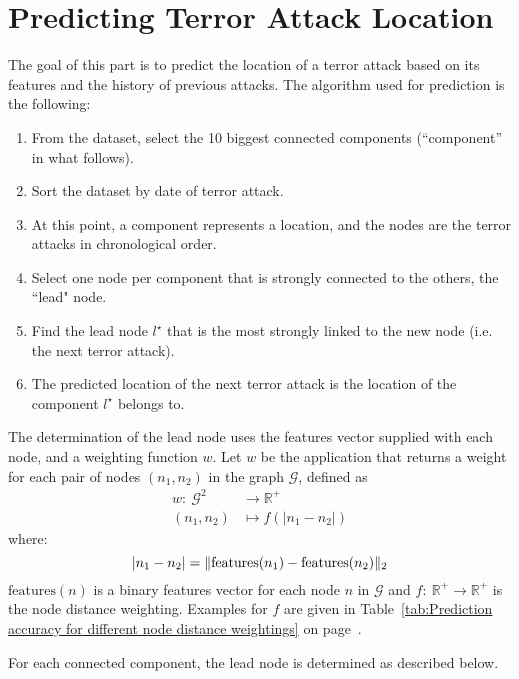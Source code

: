 \section{Predicting Terror Attack Location}
\label{sec:Predictions}
The goal of this part is to predict the location of a terror attack based on its features and the history of previous attacks.
The algorithm used for prediction is the following:
\begin{enumerate}
\item From the dataset, select the 10 biggest connected components (``component'' in what follows).
\item Sort the dataset by date of terror attack.
\item At this point, a component represents a location, and the nodes are the terror attacks in chronological order.
\item Select one node per component that is strongly connected to the others, the ``lead" node.
\item Find the lead node $l^\star$ that is the most strongly linked to the new node (i.e. the next terror attack).
\item The predicted location of the next terror attack is the location of the component $l^\star$ belongs to.
\end{enumerate}

The determination of the lead node uses the features vector supplied with each node, and a weighting function $w$.
Let $w$ be the application that returns a weight for each pair of nodes $(n_1,n_2)$ in the graph $\mathcal{G}$, defined as
\begin{align}
w:~ \mathcal{G}^2	& \to \mathbb{R}^+ \\
(n_1,n_2) 			& \mapsto f(|n_1-n_2|)
\end{align}
where:
\begin{equation}
|n_1-n_2| = \| \text{features}(n_1)-\text{features}(n_2)\|_2 \\
\end{equation}
$\text{features}(n)$ is a binary features vector for each node $n\text{ in }\mathcal{G}$ and $f:~\mathbb{R}^+ \to  \mathbb{R}^+$ is the node distance weighting.
Examples for $f$ are given in Table~\ref{tab:Prediction accuracy for different node distance weightings} on page~\pageref{tab:Prediction accuracy for different node distance weightings}.

For each connected component, the lead node is determined as described below.

\vspace{1em}

